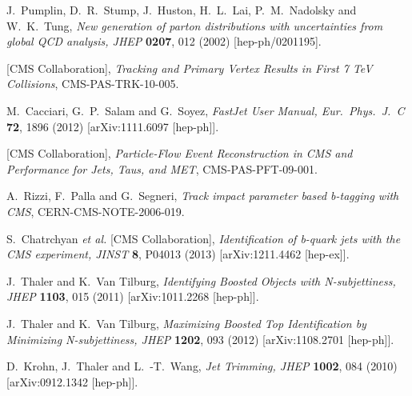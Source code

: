 \documentclass{JHEP3}
\begin{document}
\begin{thebibliography}{99}
  J.~Pumplin, D.~R.~Stump, J.~Huston, H.~L.~Lai, P.~M.~Nadolsky and W.~K.~Tung,
  \textit{New generation of parton distributions with uncertainties from global QCD analysis,
  JHEP} {\bf 0207}, 012 (2002)
  [hep-ph/0201195].

  [CMS Collaboration],
  \textit{Tracking and Primary Vertex Results in First 7 TeV Collisions},
  CMS-PAS-TRK-10-005.

  M.~Cacciari, G.~P.~Salam and G.~Soyez,
  \textit{FastJet User Manual,
  Eur.\ Phys.\ J.\ C} {\bf 72}, 1896 (2012)
  [arXiv:1111.6097 [hep-ph]].

  [CMS Collaboration],
  \textit{Particle-Flow Event Reconstruction in CMS and Performance for Jets, Taus, and MET},
  CMS-PAS-PFT-09-001.

  A.~Rizzi, F.~Palla and G.~Segneri,
  \textit{Track impact parameter based b-tagging with CMS},
  CERN-CMS-NOTE-2006-019.

  S.~Chatrchyan {\it et al.}  [CMS Collaboration],
  \textit{Identification of b-quark jets with the CMS experiment,
  JINST} {\bf 8}, P04013 (2013)
  [arXiv:1211.4462 [hep-ex]].

  J.~Thaler and K.~Van Tilburg,
  \textit{Identifying Boosted Objects with N-subjettiness,
  JHEP} {\bf 1103}, 015 (2011)
  [arXiv:1011.2268 [hep-ph]].

  J.~Thaler and K.~Van Tilburg,
  \textit{Maximizing Boosted Top Identification by Minimizing N-subjettiness,
  JHEP} {\bf 1202}, 093 (2012)
  [arXiv:1108.2701 [hep-ph]].

  D.~Krohn, J.~Thaler and L.~-T.~Wang,
  \textit{Jet Trimming,
  JHEP} {\bf 1002}, 084 (2010)
  [arXiv:0912.1342 [hep-ph]].



\end{thebibliography}
\end{document}
